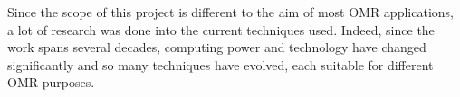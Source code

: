 Since the scope of this project is different to the aim of most OMR applications, a lot of research was done into the current techniques used. Indeed, since the work spans several decades, computing power and technology have changed significantly and so many techniques have evolved, each suitable for different OMR purposes.


